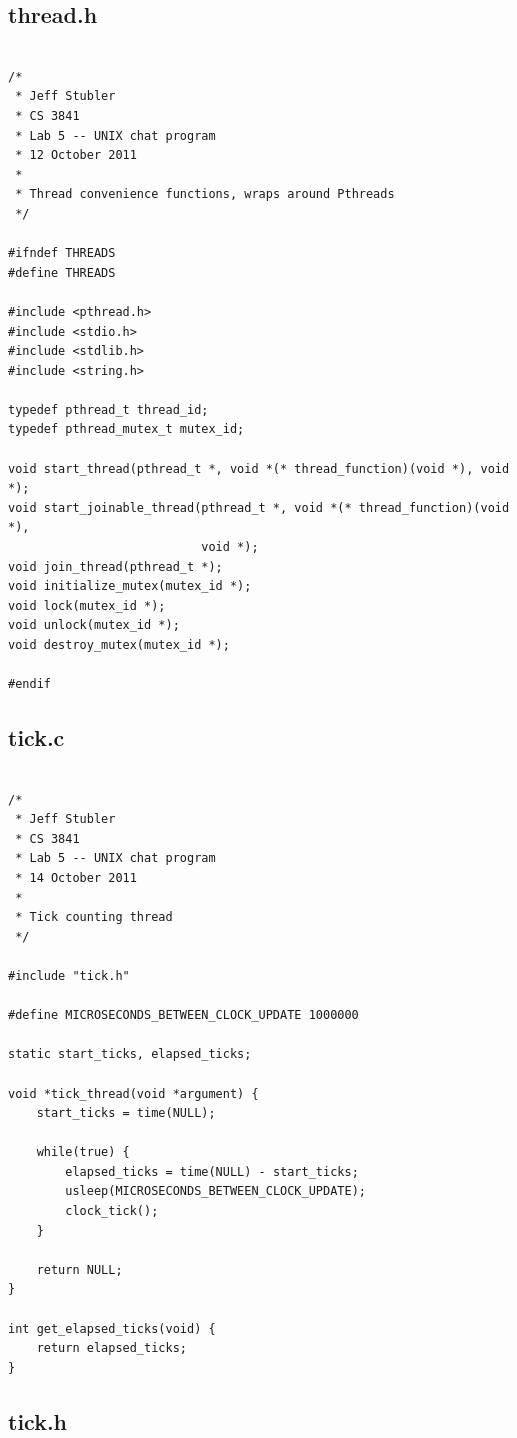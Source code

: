 \documentclass{article}
\begin{document}
\subsection*{thread.h}

\begin{verbatim}

/*
 * Jeff Stubler
 * CS 3841
 * Lab 5 -- UNIX chat program
 * 12 October 2011
 *
 * Thread convenience functions, wraps around Pthreads
 */

#ifndef THREADS
#define THREADS

#include <pthread.h>
#include <stdio.h>
#include <stdlib.h>
#include <string.h>

typedef pthread_t thread_id;
typedef pthread_mutex_t mutex_id;

void start_thread(pthread_t *, void *(* thread_function)(void *), void *);
void start_joinable_thread(pthread_t *, void *(* thread_function)(void *),
                           void *);
void join_thread(pthread_t *);
void initialize_mutex(mutex_id *);
void lock(mutex_id *);
void unlock(mutex_id *);
void destroy_mutex(mutex_id *);

#endif

\end{verbatim}

\subsection*{tick.c}

\begin{verbatim}

/*
 * Jeff Stubler
 * CS 3841
 * Lab 5 -- UNIX chat program
 * 14 October 2011
 *
 * Tick counting thread
 */

#include "tick.h"

#define MICROSECONDS_BETWEEN_CLOCK_UPDATE 1000000

static start_ticks, elapsed_ticks;

void *tick_thread(void *argument) {
    start_ticks = time(NULL);
    
    while(true) {
        elapsed_ticks = time(NULL) - start_ticks;
        usleep(MICROSECONDS_BETWEEN_CLOCK_UPDATE);
        clock_tick();
    }
    
    return NULL;
}

int get_elapsed_ticks(void) {
    return elapsed_ticks;
}

\end{verbatim}

\subsection*{tick.h}
\end{document}
